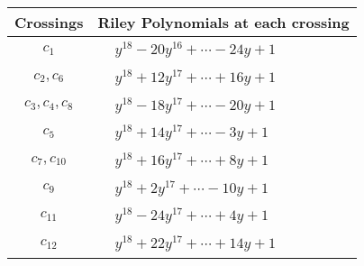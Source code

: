 \documentclass[1p]{elsarticle_modified}
\theoremstyle{definition}
\begin{document}
\begin{tabular}{m{50pt}|m{274pt}}
Crossings & \hspace{64pt}Riley Polynomials at each crossing \\
\hline $$\begin{aligned}c_{1}\end{aligned}$$&$\begin{aligned}
&y^{18}-20 y^{16}+\cdots-24 y+1
\end{aligned}$\\
\hline $$\begin{aligned}c_{2},c_{6}\end{aligned}$$&$\begin{aligned}
&y^{18}+12 y^{17}+\cdots+16 y+1
\end{aligned}$\\
\hline $$\begin{aligned}c_{3},c_{4},c_{8}\end{aligned}$$&$\begin{aligned}
&y^{18}-18 y^{17}+\cdots-20 y+1
\end{aligned}$\\
\hline $$\begin{aligned}c_{5}\end{aligned}$$&$\begin{aligned}
&y^{18}+14 y^{17}+\cdots-3 y+1
\end{aligned}$\\
\hline $$\begin{aligned}c_{7},c_{10}\end{aligned}$$&$\begin{aligned}
&y^{18}+16 y^{17}+\cdots+8 y+1
\end{aligned}$\\
\hline $$\begin{aligned}c_{9}\end{aligned}$$&$\begin{aligned}
&y^{18}+2 y^{17}+\cdots-10 y+1
\end{aligned}$\\
\hline $$\begin{aligned}c_{11}\end{aligned}$$&$\begin{aligned}
&y^{18}-24 y^{17}+\cdots+4 y+1
\end{aligned}$\\
\hline $$\begin{aligned}c_{12}\end{aligned}$$&$\begin{aligned}
&y^{18}+22 y^{17}+\cdots+14 y+1
\end{aligned}$\\
\hline
\end{tabular}\\~\\
\end{document}
